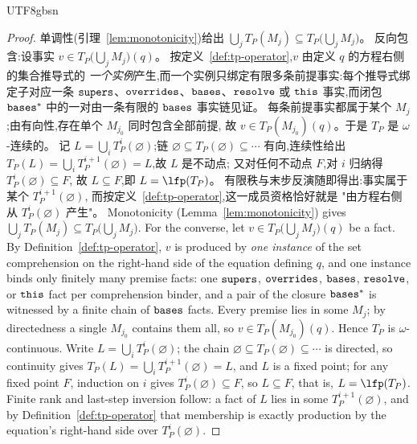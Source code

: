 \begin{CJK*}{UTF8}{gbsn}
\begin{proof}
\ifPaperChinese
  单调性(引理~\ref{lem:monotonicity})给出
  $\bigcup_{j} T_P(M_j) \subseteq T_P\bigl(\bigcup_{j} M_j\bigr)$。
  反向包含:设事实 $v \in T_P\bigl(\bigcup_{j} M_j\bigr)(q)$。
  按定义~\ref{def:tp-operator},$v$ 由定义 $q$ 的方程右侧的集合推导式的
  \emph{一个实例}产生,而一个实例只绑定有限多条前提事实:每个推导式绑定子对应一条
  $\mathtt{supers}$、$\mathtt{overrides}$、$\mathtt{bases}$、$\mathtt{resolve}$ 或 $\mathtt{this}$ 事实,而闭包
  $\mathtt{bases}^*$ 中的一对由一条有限的 $\mathtt{bases}$ 事实链见证。
  每条前提事实都属于某个 $M_j$;由有向性,存在单个 $M_{j_0}$ 同时包含全部前提,
  故 $v \in T_P(M_{j_0})(q)$。于是 $T_P$ 是 $\omega$-连续的。
  记 $L = \bigcup_{i} T_P^i(\varnothing)$;链
  $\varnothing \subseteq T_P(\varnothing) \subseteq \cdots$ 有向,连续性给出
  $T_P(L) = \bigcup_{i} T_P^{i+1}(\varnothing) = L$,故 $L$ 是不动点;
  又对任何不动点 $F$,对 $i$ 归纳得 $T_P^i(\varnothing) \subseteq F$,
  故 $L \subseteq F$,即 $L = \lfp(T_P)$。
  有限秩与末步反演随即得出:事实属于某个 $T_P^{i+1}(\varnothing)$,
  而按定义~\ref{def:tp-operator},这一成员资格恰好就是
  "由方程右侧从 $T_P^i(\varnothing)$ 产生"。
\else
  Monotonicity (Lemma~\ref{lem:monotonicity}) gives
  $\bigcup_{j} T_P(M_j) \subseteq T_P\bigl(\bigcup_{j} M_j\bigr)$.
  For the converse, let $v \in T_P\bigl(\bigcup_{j} M_j\bigr)(q)$ be a
  fact. By Definition~\ref{def:tp-operator}, $v$ is produced by
  \emph{one instance} of the set comprehension on the right-hand side
  of the equation defining $q$, and one instance binds only finitely
  many premise facts: one $\mathtt{supers}$, $\mathtt{overrides}$, $\mathtt{bases}$,
  $\mathtt{resolve}$, or $\mathtt{this}$ fact per comprehension binder, and a pair of
  the closure $\mathtt{bases}^*$ is witnessed by a finite chain of $\mathtt{bases}$
  facts. Every premise lies in some $M_j$; by directedness a single
  $M_{j_0}$ contains them all, so $v \in T_P(M_{j_0})(q)$. Hence
  $T_P$ is $\omega$-continuous.
  Write $L = \bigcup_{i} T_P^i(\varnothing)$; the chain
  $\varnothing \subseteq T_P(\varnothing) \subseteq \cdots$ is
  directed, so continuity gives
  $T_P(L) = \bigcup_{i} T_P^{i+1}(\varnothing) = L$, and $L$ is a
  fixed point; for any fixed point $F$, induction on $i$ gives
  $T_P^i(\varnothing) \subseteq F$, so $L \subseteq F$, that is,
  $L = \lfp(T_P)$.
  Finite rank and last-step inversion follow: a fact of $L$ lies in
  some $T_P^{i+1}(\varnothing)$, and by
  Definition~\ref{def:tp-operator} that membership is exactly
  production by the equation's right-hand side over
  $T_P^i(\varnothing)$.
\fi
\end{proof}


\end{CJK*}
